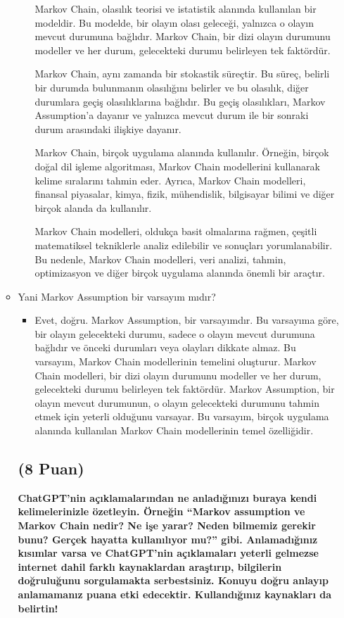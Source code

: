 \documentclass[11pt]{article}
\begin{document}
\begin{itemize}
\begin{itemize}
\begin{itemize}
{Markov Chain, olasılık teorisi ve istatistik alanında kullanılan bir modeldir. Bu modelde, bir olayın olası geleceği, yalnızca o olayın mevcut durumuna bağlıdır. Markov Chain, bir dizi olayın durumunu modeller ve her durum, gelecekteki durumu belirleyen tek faktördür.

Markov Chain, aynı zamanda bir stokastik süreçtir. Bu süreç, belirli bir durumda bulunmanın olasılığını belirler ve bu olasılık, diğer durumlara geçiş olasılıklarına bağlıdır. Bu geçiş olasılıkları, Markov Assumption'a dayanır ve yalnızca mevcut durum ile bir sonraki durum arasındaki ilişkiye dayanır.

Markov Chain, birçok uygulama alanında kullanılır. Örneğin, birçok doğal dil işleme algoritması, Markov Chain modellerini kullanarak kelime sıralarını tahmin eder. Ayrıca, Markov Chain modelleri, finansal piyasalar, kimya, fizik, mühendislik, bilgisayar bilimi ve diğer birçok alanda da kullanılır.

Markov Chain modelleri, oldukça basit olmalarına rağmen, çeşitli matematiksel tekniklerle analiz edilebilir ve sonuçları yorumlanabilir. Bu nedenle, Markov Chain modelleri, veri analizi, tahmin, optimizasyon ve diğer birçok uygulama alanında önemli bir araçtır.}
        \end{itemize}
        \item{Yani Markov Assumption bir varsayım mıdır?}
        \begin{itemize}
            \item {Evet, doğru. Markov Assumption, bir varsayımdır. Bu varsayıma göre, bir olayın gelecekteki durumu, sadece o olayın mevcut durumuna bağlıdır ve önceki durumları veya olayları dikkate almaz. Bu varsayım, Markov Chain modellerinin temelini oluşturur. Markov Chain modelleri, bir dizi olayın durumunu modeller ve her durum, gelecekteki durumu belirleyen tek faktördür. Markov Assumption, bir olayın mevcut durumunun, o olayın gelecekteki durumunu tahmin etmek için yeterli olduğunu varsayar. Bu varsayım, birçok uygulama alanında kullanılan Markov Chain modellerinin temel özelliğidir.}
        \end{itemize}

\subsection{(8 Puan)} \textbf{ChatGPT’nin açıklamalarından ne anladığınızı buraya kendi kelimelerinizle özetleyin. Örneğin ``Markov assumption ve Markov Chain nedir? Ne işe yarar? Neden bilmemiz gerekir bunu? Gerçek hayatta kullanılıyor mu?'' gibi. Anlamadığınız kısımlar varsa ve ChatGPT’nin açıklamaları yeterli gelmezse internet dahil farklı kaynaklardan araştırıp, bilgilerin doğruluğunu sorgulamakta serbestsiniz. Konuyu doğru anlayıp anlamamanız puana etki edecektir. Kullandığınız kaynakları da belirtin!}


\end{itemize}
\end{itemize}
\end{document}
